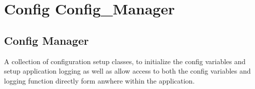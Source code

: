 \documentclass[letterpaper,10pt,english]{sphinxmanual}
\begin{document}
\chapter{Config Config\_Manager}
\label{\detokenize{index:module-config.config_manager}}\label{\detokenize{index:config-config-manager}}

\section{Config Manager}
\label{\detokenize{index:config-manager}}
A collection of configuration setup
classes, to initialize the config
variables and setup application
logging as well as allow access to
both the config variables and logging
function directly form anwhere within
the application.
\end{document}
